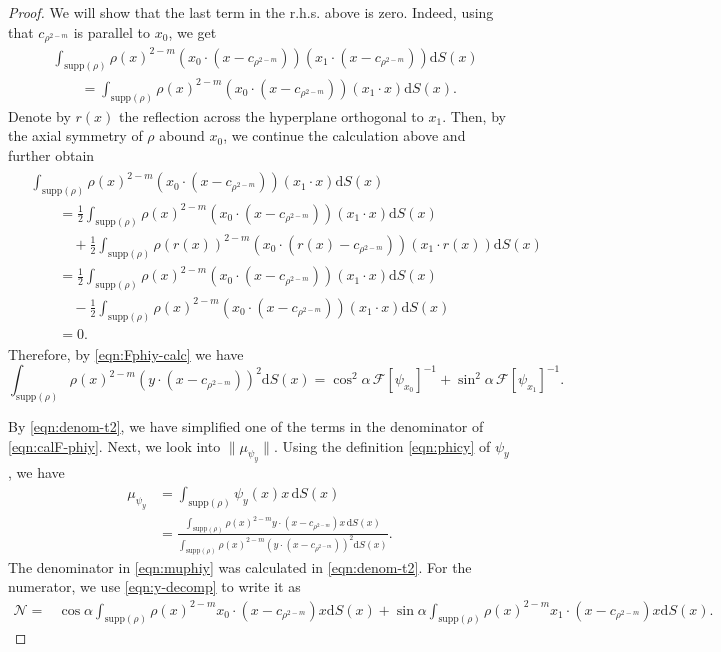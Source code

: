 \documentclass[11pt]{amsart}
\newcommand{\dx}{\mathrm{d}S (x)}
\newcommand{\supp}{\mathrm{supp}(\rho)}
\begin{document}
\begin{proof}
We will show that the last term in the r.h.s. above is zero. Indeed, using that $c_{\rho^{2-m}}$ is parallel to $x_0$, we get
\begin{align*}
&\int_{\supp}\rho(x)^{2-m}(x_0\cdot(x-c_{\rho^{2-m}}))(x_1\cdot(x-c_{\rho^{2-m}}))\dx\\
&\qquad =\int_{\supp}\rho(x)^{2-m}(x_0\cdot(x-c_{\rho^{2-m}}))(x_1\cdot x)\dx.
\end{align*}
Denote by $r(x)$ the reflection across the hyperplane orthogonal to $x_1$. Then, by the axial symmetry of $\rho$ abound $x_0$, we continue the calculation above and further obtain
\begin{align}
\begin{aligned}\label{symmetric0}
& \int_{\supp}\rho(x)^{2-m}(x_0\cdot (x-c_{\rho^{2-m}}))(x_1\cdot x)\dx \\
&\qquad =\frac{1}{2}\int_{\supp}\rho(x)^{2-m}(x_0\cdot (x-c_{\rho^{2-m}}))(x_1\cdot x)\dx \\
& \qquad \quad +\frac{1}{2}\int_{\supp}\rho(r(x))^{2-m}(x_0\cdot (r(x)-c_{\rho^{2-m}}))(x_1\cdot r(x))\dx\\
& \qquad =\frac{1}{2}\int_{\supp}\rho(x)^{2-m}(x_0\cdot (x-c_{\rho^{2-m}}))(x_1\cdot x)\dx \\
& \qquad \quad -\frac{1}{2}\int_{\supp}\rho(x)^{2-m}(x_0\cdot (x-c_{\rho^{2-m}}))(x_1\cdot x)\dx\\
&\qquad =0.
\end{aligned}
\end{align}
Therefore, by \eqref{eqn:Fphiy-calc} we have
\begin{equation}
\label{eqn:denom-t2}
\int_{\supp}\rho(x)^{2-m}\left(y\cdot (x-c_{\rho^{2-m}})\right)^2\dx=\cos^2\alpha \, \mathcal{F}[\psi_{x_0}]^{-1}+\sin^2\alpha \, \mathcal{F}[\psi_{x_1}]^{-1}.
\end{equation}

By \eqref{eqn:denom-t2}, we have simplified one of the terms in the denominator of \eqref{eqn:calF-phiy}. Next, we look into $\|\mu_{\psi_y}\|$. Using the definition \eqref{eqn:phicy} of $\psi_y$, we have
\begin{equation}
\label{eqn:muphiy}
\begin{aligned}
\mu_{\psi_y}&=\int_{\supp} \psi_y(x)x\, \dx\\
&=\frac{\int_{\supp}\rho(x)^{2-m}y\cdot(x-c_{\rho^{2-m}})x\, \dx}{\int_{\supp}\rho(x)^{2-m}\left( y\cdot (x-c_{\rho^{2-m}})\right)^2\dx}.
\end{aligned}
\end{equation}
The denominator in \eqref{eqn:muphiy} was calculated in \eqref{eqn:denom-t2}. For the numerator, we use \eqref{eqn:y-decomp} to write it as
\begin{align*}
\mathcal{N}=&\cos\alpha\int_{\supp}\rho(x)^{2-m}x_0\cdot(x-c_{\rho^{2-m}})x\dx+\sin\alpha\int_{\supp}\rho(x)^{2-m}x_1\cdot(x-c_{\rho^{2-m}})x\dx.
\end{align*}


\end{proof}
\end{document}
